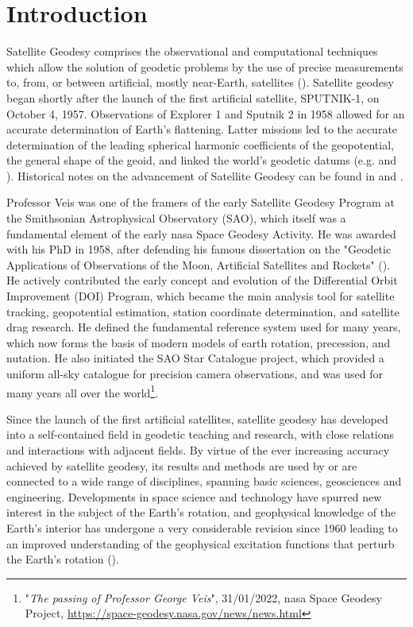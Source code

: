 \section{Introduction}\label{sec:introduction}

Satellite Geodesy comprises the observational and computational techniques which allow
the solution of geodetic problems by the use of precise measurements to, from, or between
artificial, mostly near-Earth, satellites (\cite{Seeber2003}). Satellite geodesy began
shortly after the launch of the first artificial satellite, SPUTNIK-1, on October 4, 1957.
Observations of Explorer 1 and Sputnik 2 in 1958 allowed for an accurate determination of
Earth's flattening. Latter missions led to the accurate determination of the leading
spherical harmonic coefficients of the geopotential, the general shape of the geoid,
and linked the world's geodetic datums (e.g. \cite{KingHele1958} and \cite{Merson1958}).
Historical notes on the advancement of Satellite Geodesy can be found in \cite{Seeber2003}
and \cite{Barlier2001}.

Professor Veis was one of the framers of the early Satellite Geodesy Program at the
Smithsonian Astrophysical Observatory (SAO), which itself was a fundamental element of
the early \gls{nasa} Space Geodesy Activity. He was awarded with his PhD in 1958,
after defending his famous dissertation on the "Geodetic Applications of Observations
of the Moon, Artificial Satellites and Rockets" (\cite{Veis1960}). He actively contributed the early
concept and evolution of the Differential Orbit Improvement (DOI) Program, which became
the main analysis tool for satellite tracking, geopotential estimation, station
coordinate determination, and satellite drag research. He defined the fundamental
reference system used for many years, which now forms the basis of modern models
of earth rotation, precession, and nutation. He also initiated the SAO Star Catalogue
project, which provided a uniform all-sky catalogue for precision camera observations,
and was used for many years all over the world\footnote{"\textit{The passing of Professor George Veis}",
31/01/2022, \gls{nasa} Space Geodesy Project, \url{https://space-geodesy.nasa.gov/news/news.html}}.

Since the launch of the first artificial satellites, satellite geodesy has developed into a
self-contained field in geodetic teaching and research, with close relations and interactions
with adjacent fields. By virtue of the ever increasing accuracy achieved by satellite geodesy,
its results and methods are used by or are connected to a wide range of disciplines, spanning
basic sciences, geosciences and engineering.
Developments in space science and technology have spurred new interest
in the subject of the Earth's rotation,  and geophysical knowledge of the Earth's interior has
undergone a very considerable revision since 1960 leading to an improved understanding of the
geophysical excitation functions that perturb the Earth's rotation (\cite{Lambeck1980}).

